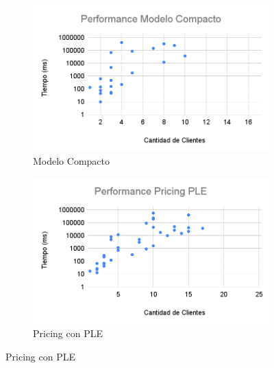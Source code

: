 \begin{figure}[H]
     \centering
     \begin{subfigure}[b]{0.45\textwidth}
         \centering
         \includegraphics[width=\textwidth]{img/Performance Modelo Compacto (1).png}
         \caption{Modelo Compacto}
     \end{subfigure}
     \hfill
     \begin{subfigure}[b]{0.45\textwidth}
         \centering
         \includegraphics[width=\textwidth]{img/Performance Pricing PLE (1).png}
         \caption{Pricing con PLE}
     \end{subfigure}


\end{figure}

